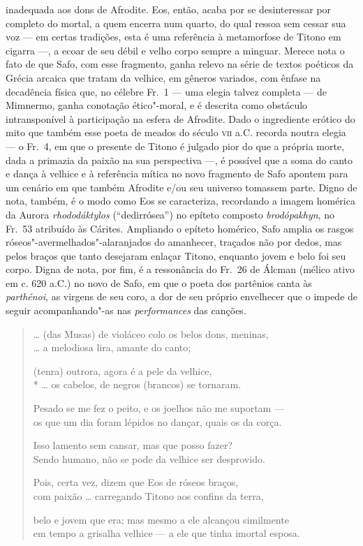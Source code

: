 inadequada aos dons de Afrodite. Eos, então, acaba por se desinteressar por
completo do mortal, a quem encerra num quarto, do qual ressoa sem cessar sua
voz --- em certas tradições, esta é uma referência à metamorfose de Titono em
cigarra ---, a ecoar de seu débil e velho corpo sempre a minguar. Merece nota o fato de
que Safo, com esse fragmento, ganha relevo na série de textos poéticos da
Grécia arcaica que tratam da velhice, em gêneros variados, com ênfase na
decadência física que, no célebre Fr.~1 --- uma elegia talvez completa --- de
Mimnermo, ganha conotação ético"-moral, e é descrita como obstáculo
intransponível à participação na esfera de Afrodite.
Dado o ingrediente erótico do mito que também esse poeta de meados do século
\textsc{vii} a.C. recorda noutra elegia --- o Fr.~4, em que o presente de Titono é
julgado pior do que a própria morte, dada a primazia da paixão na sua perspectiva
---, é possível que a soma do canto e dança à
velhice e à referência mítica no novo fragmento de Safo apontem para um cenário
em que também Afrodite e/ou seu universo tomassem parte. Digno de nota, também,
é o modo como Eos se caracteriza, recordando a imagem homérica da Aurora
\textit{rhododáktylos} (``dedirrósea'') no
epíteto composto \textit{brodópakhyn}, no Fr.~53 atribuído às Cárites.
Ampliando o epíteto homérico, Safo amplia os rasgos
róseos"-avermelhados"-alaranjados do amanhecer, traçados não por dedos, mas pelos
braços que tanto desejaram enlaçar Titono, enquanto jovem e belo foi seu
corpo. Digna de nota, por fim, é a ressonância do Fr.~26 de Álcman (mélico ativo em c. 620 a.C.) no novo de Safo, em que o poeta dos partênios canta às \textit{parthénoi}, as virgens de seu coro, a dor de seu próprio envelhecer que o impede de seguir acompanhando"-as nas \textit{performances} das canções.


\begin{verse}
\ldots{} (das Musas) de violáceo colo os belos dons, meninas,\\
\ldots{} a melodiosa lira, amante do canto;

(tenra) outrora, agora é a pele da velhice,\\*
\ldots{} os cabelos, de negros (brancos) se tornaram.


Pesado se me fez o peito, e os joelhos não me suportam --- \\
os que um dia foram lépidos no dançar, quais os da corça.

Isso lamento sem cansar, mas que posso fazer?\\
Sendo humano, não se pode da velhice ser desprovido.

Pois, certa vez, dizem que Eos de róseos braços,\\
com paixão \ldots{} carregando Titono aos confins da terra,

belo e jovem que era; mas mesmo a ele alcançou similmente\\
em tempo a grisalha velhice --- a ele que tinha imortal esposa.
\end{verse}

